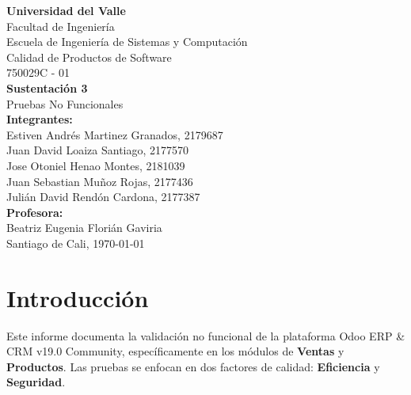 \documentclass[12pt, letterpaper]{article}
\begin{document}
\begin{titlepage}
    \centering
    \vspace*{1.5cm}
    
    {\Large \textbf{Universidad del Valle}}\\
    {\Large Facultad de Ingeniería}\\
    {\Large Escuela de Ingeniería de Sistemas y Computación}\\
    {\Large Calidad de Productos de Software}\\
    {\Large 750029C - 01}\\[2.5cm]
    
    {\LARGE \textbf{Sustentación 3}}\\[0.3cm]
    {\Large Pruebas No Funcionales}\\[2cm]
    
    {\large \textbf{Integrantes:}}\\
    \vspace{0.2cm}
    Estiven Andrés Martinez Granados, 2179687\\
    Juan David Loaiza Santiago, 2177570\\
    Jose Otoniel Henao Montes, 2181039\\
    Juan Sebastian Muñoz Rojas, 2177436\\
    Julián David Rendón Cardona, 2177387\\[2cm]
    
    {\large \textbf{Profesora:}}\\
    {\large Beatriz Eugenia Florián Gaviria}\\[2cm]
    
    {\large Santiago de Cali, \today}
    
    \vfill
\end{titlepage}

\tableofcontents
\newpage

\section{Introducción}

Este informe documenta la validación no funcional de la plataforma Odoo ERP \& CRM v19.0 Community, específicamente en los módulos de \textbf{Ventas} y \textbf{Productos}. Las pruebas se enfocan en dos factores de calidad: \textbf{Eficiencia} y \textbf{Seguridad}.
\end{document}
